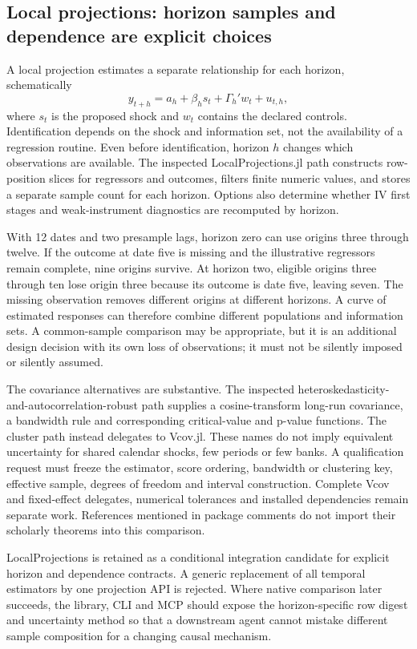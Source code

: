 \subsection{Local projections: horizon samples and dependence are explicit choices}

A local projection estimates a separate relationship for each horizon, schematically
\[
 y_{t+h}=a_h+\beta_h s_t+\Gamma_h'w_t+u_{t,h},
\]
where $s_t$ is the proposed shock and $w_t$ contains the declared controls. Identification depends on the shock and information set, not the availability of a regression routine. Even before identification, horizon $h$ changes which observations are available. The inspected LocalProjections.jl path constructs row-position slices for regressors and outcomes, filters finite numeric values, and stores a separate sample count for each horizon. Options also determine whether IV first stages and weak-instrument diagnostics are recomputed by horizon.\citep{exec25_odyn_lp}

With 12 dates and two presample lags, horizon zero can use origins three through twelve. If the outcome at date five is missing and the illustrative regressors remain complete, nine origins survive. At horizon two, eligible origins three through ten lose origin three because its outcome is date five, leaving seven. The missing observation removes different origins at different horizons. A curve of estimated responses can therefore combine different populations and information sets. A common-sample comparison may be appropriate, but it is an additional design decision with its own loss of observations; it must not be silently imposed or silently assumed.\citep{exec25_odyn_lp,exec25_odyn_choice}

The covariance alternatives are substantive. The inspected heteroskedasticity-and-autocorrelation-robust path supplies a cosine-transform long-run covariance, a bandwidth rule and corresponding critical-value and p-value functions. The cluster path instead delegates to Vcov.jl. These names do not imply equivalent uncertainty for shared calendar shocks, few periods or few banks. A qualification request must freeze the estimator, score ordering, bandwidth or clustering key, effective sample, degrees of freedom and interval construction. Complete Vcov and fixed-effect delegates, numerical tolerances and installed dependencies remain separate work. References mentioned in package comments do not import their scholarly theorems into this comparison.

LocalProjections is retained as a conditional integration candidate for explicit horizon and dependence contracts. A generic replacement of all temporal estimators by one projection API is rejected. Where native comparison later succeeds, the library, CLI and MCP should expose the horizon-specific row digest and uncertainty method so that a downstream agent cannot mistake different sample composition for a changing causal mechanism.\citep{exec25_odyn_lp,exec25_odyn_choice}


